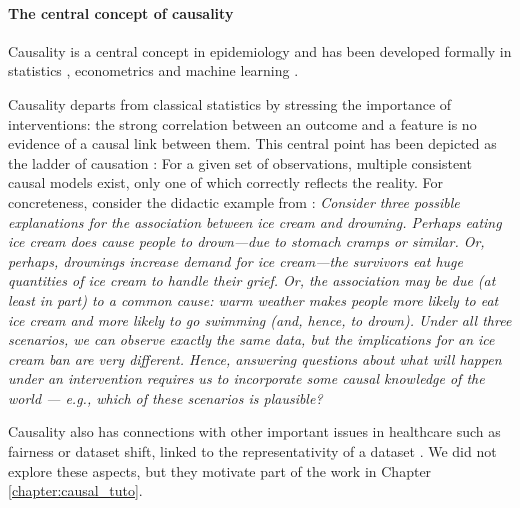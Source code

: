 \documentclass[french,12pt,twoside,a4paper]{book}
\begin{document}
\begin{background_box_left}



  \paragraph{The central concept of causality}%
  \label{subsec:intro:causation}%

  Causality is a central concept in epidemiology
  \citep{hill1965environment,hernan2020causal} and has been developed formally
  in statistics \citep{rubin1974estimating}, econometrics
  \citep{imbens2009recent} and machine learning \citep{pearl2018book}.

  Causality departs from classical statistics by stressing the importance of
  interventions: the strong correlation between an outcome and a feature is no
  evidence of a causal link between them. This central point has been depicted
  as the ladder of causation \citep{pearl2018book}: For a given set of
  observations, multiple consistent causal models exist, only one of which
  correctly reflects the reality. For concreteness, consider the didactic
  example from \cite{murphy2022probabilistic_chapter36}: \textit{Consider three
    possible explanations for the association between ice cream and drowning.
    Perhaps eating ice cream does cause people to drown—due to stomach cramps or
    similar. Or, perhaps, drownings increase demand for ice cream—the survivors
    eat huge quantities of ice cream to handle their grief. Or, the association
    may be due (at least in part) to a common cause: warm weather makes people
    more likely to eat ice cream and more likely to go swimming (and, hence, to
    drown). Under all three scenarios, we can observe exactly the same data, but
    the implications for an ice cream ban are very different. Hence, answering
    questions about what will happen under an intervention requires us to
    incorporate some causal knowledge of the world — e.g., which of these scenarios
    is plausible?}

  Causality also has connections with other important issues in healthcare such
  as fairness \citep{plecko2022causal} or dataset shift, linked to the representativity of a
  dataset \citep{subbaswamy2020development}. We did not explore these aspects,
  but they motivate part of the work in Chapter \ref{chapter:causal_tuto}.


\end{background_box_left}
\end{document}
